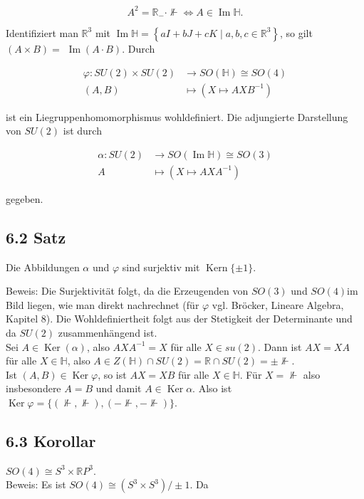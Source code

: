 \documentclass[10pt, letterpaper]{article}
\begin{document}
$$
A^{2}=\mathbb{R}_{-} \cdot \nVdash \Leftrightarrow A \in \operatorname{Im} \mathbb{H} .
$$

Identifiziert man $\mathbb{R}^{3}$ mit $\operatorname{Im} \mathbb{H}=\left\{a I+b J+c K \mid a, b, c \in \mathbb{R}^{3}\right\}$, so gilt $(A \times B)=$ $\operatorname{Im}(A \cdot B)$. Durch

$$
\begin{aligned}
\varphi: S U(2) \times S U(2) & \rightarrow S O(\mathbb{H}) \cong S O(4) \\
(A, B) & \mapsto\left(X \mapsto A X B^{-1}\right)
\end{aligned}
$$

ist ein Liegruppenhomomorphismus wohldefiniert. Die adjungierte Darstellung von $S U(2)$ ist durch

$$
\begin{aligned}
\alpha: S U(2) & \rightarrow S O(\operatorname{Im} \mathbb{H}) \cong S O(3) \\
A & \mapsto\left(X \mapsto A X A^{-1}\right)
\end{aligned}
$$

gegeben.

\subsection*{6.2 Satz}
Die Abbildungen $\alpha$ und $\varphi$ sind surjektiv mit $\operatorname{Kern}\{ \pm 1\}$.

Beweis: Die Surjektivität folgt, da die Erzeugenden von $S O(3)$ und $S O(4) \mathrm{im}$ Bild liegen, wie man direkt nachrechnet (für $\varphi$ vgl. Bröcker, Lineare Algebra, Kapitel 8). Die Wohldefiniertheit folgt aus der Stetigkeit der Determinante und da $S U(2)$ zusammenhängend ist.\\
Sei $A \in \operatorname{Ker}(\alpha)$, also $A X A^{-1}=X$ für alle $X \in s u(2)$. Dann ist $A X=X A$ für alle $X \in \mathbb{H}$, also $A \in Z(\mathbb{H}) \cap S U(2)=\mathbb{R} \cap S U(2)= \pm \nVdash$.\\
Ist $(A, B) \in \operatorname{Ker} \varphi$, so ist $A X=X B$ für alle $X \in \mathbb{H}$. Für $X=\nVdash$ also insbesondere $A=B$ und damit $A \in \operatorname{Ker} \alpha$. Also ist $\operatorname{Ker} \varphi=\{(\nVdash, \nVdash),(-\nVdash,-\nVdash)\}$.

\subsection*{6.3 Korollar}
$S O(4) \cong S^{3} \times \mathbb{R} P^{3}$.\\
Beweis: Es ist $S O(4) \cong\left(S^{3} \times S^{3}\right) / \pm 1$. Da
\end{document}
